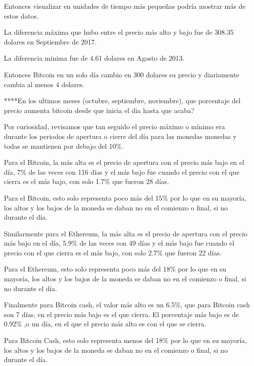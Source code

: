 \documentclass[12pt,letterpaper]{article}
\begin{document}

    Entonces visualizar en unidades de tiempo m\'as peque\~nas podr\'ia mostrar m\'as de estos datos.

    La diferencia m\'axima que hubo entre el precio m\'as alto y bajo fue de 308.35 dolares en Septiembre de 2017.

    La diferencia m\'inima fue de 4.61 dolares en Agosto de 2013.

    Entonces Bitcoin en un solo d\'ia cambio en 300 dolares su precio y diariamente cambia al menos 4 dolares.


    ****En los ultimos meses (octubre, septiembre, noviembre), que porcentaje del precio aumenta bitcoin desde que inicia el dia hasta que acaba?
    

    Por curiosidad, revisamos que tan seguido el precio máximo o mínimo era durante los periodos de apertura o cierre del día para las monedas monedas y todas se mantienen por debajo del 10\%.

    Para el Bitcoin, la más alta es el precio de apertura con el precio más bajo en el día, 7\% de las veces con 116 días y el más bajo fue cuando el precio con el que cierra es el más bajo, con solo 1.7\% que fueron 28 días.

    Para el Bitcoin, esto solo representa poco más del 15\% por lo que en su mayoría, los altos y los bajos de la moneda se daban no en el comienzo o final, si no durante el día.



    Similarmente para el Ethereum, la más alta es el precio de apertura con el precio más bajo en el día, 5.9\% de las veces con 49 días y el más bajo fue cuando el precio con el que cierra es el más bajo, con solo 2.7\% que fueron 22 días.

    Para el Ethereum, esto solo representa poco más del 18\% por lo que en su mayoría, los altos y los bajos de la moneda se daban no en el comienzo o final, si no durante el día.



    Finalmente para Bitcoin cash, el valor más alto es un 6.5\%, que para Bitcoin cash son 7 días, en el precio más bajo es el que cierra. El porcentaje más bajo es de 0.92\% ,o un día, en el que el precio más alto es con el que se cierra.
    
    Para Bitcoin Cash, esto solo representa menos del 18\% por lo que en su mayoría, los altos y los bajos de la moneda se daban no en el comienzo o final, si no durante el día.
\end{document}
